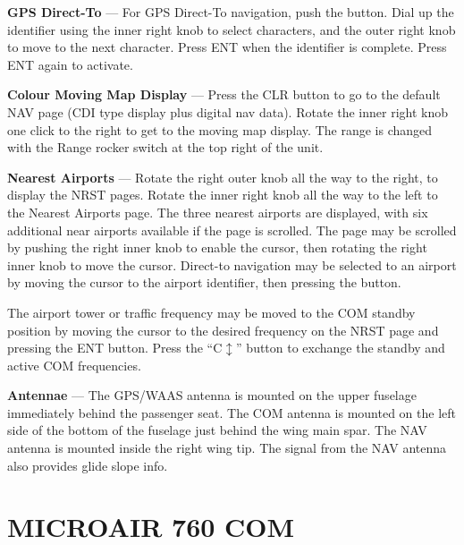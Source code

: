 \textbf{GPS Direct-To} --- For GPS Direct-To navigation, push the \directto button. Dial up the identifier using the inner right knob to select characters, and the outer right knob to move to the next character. Press ENT when the identifier is complete. Press ENT again to activate.

\textbf{Colour Moving Map Display} --- Press the CLR button to go to the default NAV page (CDI type display plus digital nav data). Rotate the inner right knob one click to the right to get to the moving map display. The range is changed with the Range rocker switch at the top right of the unit.

\textbf{Nearest Airports} --- Rotate the right outer knob all the way to the right, to display the NRST pages. Rotate the inner right knob all the way to the left to the Nearest Airports page. The three nearest airports are displayed, with six additional near airports available if the page is scrolled. The page may be scrolled by pushing the right inner knob to enable the cursor, then rotating the right inner knob to move the cursor. Direct-to navigation may be selected to an airport by moving the cursor to the airport identifier, then pressing the \directto button.

The airport tower or traffic frequency may be moved to the COM standby position by moving the cursor to the desired frequency on the NRST page and pressing the ENT button. Press the ``C$\updownarrow$'' button to exchange the standby and active COM frequencies.

\textbf{Antennae} --- The GPS/WAAS antenna is mounted on the upper fuselage immediately behind the passenger seat. The COM antenna is mounted on the left side of the bottom of the fuselage just behind the wing main spar. The NAV antenna is mounted inside the right wing tip. The signal from the NAV antenna also provides glide slope info.

\section{MICROAIR 760 COM} 


